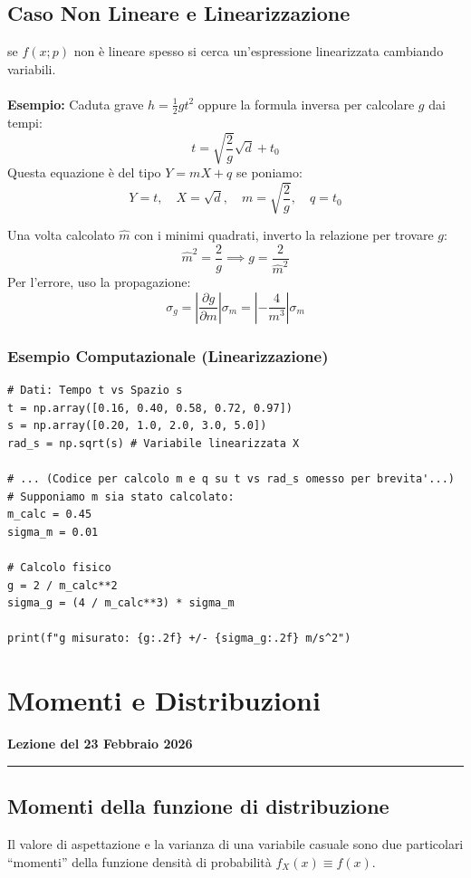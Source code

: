 \documentclass[openany,a4paper,12pt]{book}
\theoremstyle{remark}
\newcommand{\thelezione}{}
\newcommand{\lezione}[2]{
\newpage
\renewcommand{\thelezione}{#2} 
\section{#1} 
\noindent\textbf{\color{RoyalBlue}Lezione del #2}\par\vspace{0.5em}\hrule\vspace{1em}
}
\begin{document}
\subsection*{Caso Non Lineare e Linearizzazione}
se $f(x; p)$ non è lineare spesso si cerca un'espressione linearizzata cambiando variabili.
\\
\\
\textbf{Esempio:} Caduta grave $h = \frac{1}{2}g t^2$ oppure la formula inversa per calcolare $g$ dai tempi:
\[ t = \sqrt{\frac{2}{g}}\sqrt{d} + t_0 \]
Questa equazione è del tipo $Y = mX + q$ se poniamo:
\[ Y = t, \quad X = \sqrt{d}, \quad m = \sqrt{\frac{2}{g}}, \quad q = t_0 \]

Una volta calcolato $\hat{m}$ con i minimi quadrati, inverto la relazione per trovare $g$:
\[ \hat{m}^2 = \frac{2}{g} \implies g = \frac{2}{\hat{m}^2} \]
Per l'errore, uso la propagazione:
\[ \sigma_g = \left| \frac{\partial g}{\partial m} \right| \sigma_m = \left| - \frac{4}{m^3} \right| \sigma_m \]

\subsubsection*{Esempio Computazionale (Linearizzazione)}
\begin{lstlisting}[caption={Linearizzazione per calcolo di g}]
# Dati: Tempo t vs Spazio s
t = np.array([0.16, 0.40, 0.58, 0.72, 0.97]) 
s = np.array([0.20, 1.0, 2.0, 3.0, 5.0])
rad_s = np.sqrt(s) # Variabile linearizzata X

# ... (Codice per calcolo m e q su t vs rad_s omesso per brevita'...)
# Supponiamo m sia stato calcolato:
m_calc = 0.45 
sigma_m = 0.01

# Calcolo fisico
g = 2 / m_calc**2
sigma_g = (4 / m_calc**3) * sigma_m

print(f"g misurato: {g:.2f} +/- {sigma_g:.2f} m/s^2")
\end{lstlisting}







\lezione{Momenti e Distribuzioni}{23 Febbraio 2026}


\subsection{Momenti della funzione di distribuzione}



Il valore di aspettazione e la varianza di una variabile casuale sono due particolari “momenti” della funzione densità di probabilità $f_X(x) \equiv f(x)$.
\end{document}
